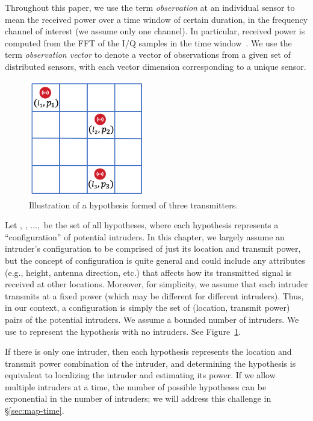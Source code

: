  Throughout this
paper, we use the term {\em observation} at an individual sensor to
mean the received power over a time window of certain duration, in the
frequency channel of interest (we assume only one channel). In
particular, received power is computed from the FFT of the I/Q samples
in the time window~\cite{arani2018}. We use the term {\em observation
  vector} \vx to denote a vector of observations from a given set of
distributed sensors, with each vector dimension corresponding to a
unique sensor.

\begin{figure}
\includegraphics[width=2in]{chapters/ipsn/figures/hypothesis.png}
\caption{Illustration of a hypothesis formed of three transmitters.}
\label{fig:hypothesis-grid}
\end{figure}
 Let \hz, \ho, $\ldots,$ \hM be the set of all
hypotheses, where each hypothesis \hj represents a ``configuration''
of potential intruders. In this chapter, we largely assume an
  intruder's configuration to be comprised of just its location and
  transmit power, but the concept of configuration is quite general
  and could include any attributes (e.g., height, antenna direction,
  etc.) that affects how its transmitted signal is received at other
  locations. Moreover, for simplicity, we assume that each intruder
  transmits at a fixed power (which may be different for different
  intruders). Thus, in our context, a configuration is simply the set
of (location, transmit power) pairs of the potential intruders. We
assume a bounded number of intruders. We use \hz to represent the
hypothesis with no intruders. See Figure~\ref{fig:hypothesis-grid}.

If there is only one intruder, then each hypothesis represents the
location and transmit power combination of the intruder, and
determining the hypothesis is equivalent to localizing the intruder
and estimating its power. If we allow multiple intruders at a time,
the number of possible hypotheses can be exponential in the number of
intruders; we will address this challenge in
\S\ref{sec:map-time}.

